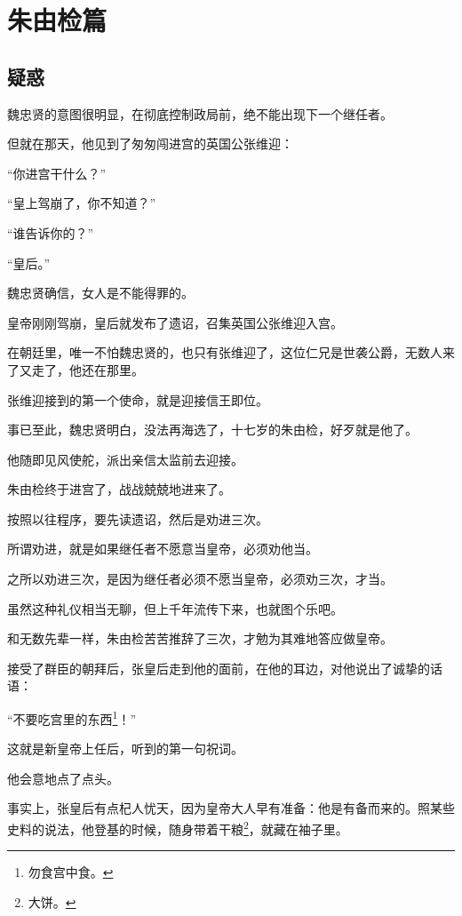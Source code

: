 \fi
\newpage

\chapter*{朱由检篇}
\section{疑惑}
\ifnum{}
	\begin{multicols}{\theparacolNo}
\fi
魏忠贤的意图很明显，在彻底控制政局前，绝不能出现下一个继任者。

但就在那天，他见到了匆匆闯进宫的英国公张维迎：

“你进宫干什么？”

“皇上驾崩了，你不知道？”

“谁告诉你的？”

“皇后。”

魏忠贤确信，女人是不能得罪的。

皇帝刚刚驾崩，皇后就发布了遗诏，召集英国公张维迎入宫。

在朝廷里，唯一不怕魏忠贤的，也只有张维迎了，这位仁兄是世袭公爵，无数人来了又走了，他还在那里。

张维迎接到的第一个使命，就是迎接信王即位。

事已至此，魏忠贤明白，没法再海选了，十七岁的朱由检，好歹就是他了。

他随即见风使舵，派出亲信太监前去迎接。

朱由检终于进宫了，战战兢兢地进来了。

按照以往程序，要先读遗诏，然后是劝进三次。

所谓劝进，就是如果继任者不愿意当皇帝，必须劝他当。

之所以劝进三次，是因为继任者必须不愿当皇帝，必须劝三次，才当。

虽然这种礼仪相当无聊，但上千年流传下来，也就图个乐吧。

和无数先辈一样，朱由检苦苦推辞了三次，才勉为其难地答应做皇帝。

接受了群臣的朝拜后，张皇后走到他的面前，在他的耳边，对他说出了诚挚的话语：

“不要吃宫里的东西\footnote{勿食宫中食。}！”

这就是新皇帝上任后，听到的第一句祝词。

他会意地点了点头。

事实上，张皇后有点杞人忧天，因为皇帝大人早有准备：他是有备而来的。照某些史料的说法，他登基的时候，随身带着干粮\footnote{大饼。}，就藏在袖子里。


\end{multicols}

